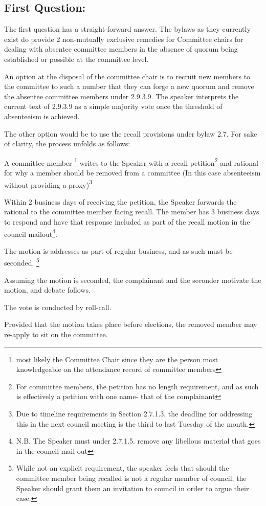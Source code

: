 \subsection*{First Question:}
The first question has a straight-forward answer.  The bylaws as they currently exist do provide 2 non-mutually exclusive remedies for Committee chairs for dealing with absentee committee members in the absence of quorum being established or possible at the committee level.

An option at the disposal of the committee chair is to recruit new members to the committee to such a number that they can forge a new quorum and remove the absentee committee members under 2.9.3.9.  The speaker interprets the current text of 2.9.3.9 as a simple majority vote once the threshold of absenteeism is achieved.    

The other option would be to use the recall provisions under bylaw 2.7. For sake of clarity, the process unfolds as follows:  
\begin{longenum}[ label*=\arabic*., align=left]

\item A committee member \footnote{most likely the Committee Chair since they are the person most knowledgeable on the attendance record of committee members} writes to the Speaker with a recall petition\footnote{For committee members, the petition has no length requirement, and as such is effectively a petition with one name- that of the complainant} and rational for why a member should be removed from a committee (In this case absenteeism without providing a proxy)\footnote{Due to timeline requirements in Section 2.7.1.3, the deadline for addressing this in the next council meeting is the third to last Tuesday of the month.}
\item Within 2 business days of receiving the petition, the Speaker forwards the rational to the committee member facing recall. The member has 3 business days to respond and have that response included as part of the recall motion in the council mailout\footnote{N.B. The Speaker must under 2.7.1.5. remove any libellous material that goes in the council mail out}.  
\item The motion is addresses as part of regular business, and as such must be seconded. \footnote{While not an explicit requirement, the speaker feels that should the committee member being recalled is not a regular member of council, the Speaker should grant them an invitation to council in order to argue their case.}  
\item Assuming the motion is seconded, the complainant and the seconder motivate the motion, and debate follows.
\item The vote is conducted by roll-call.
\item Provided that the motion takes place before elections, the removed member may re-apply to sit on the committee.  
\end{longenum}  



